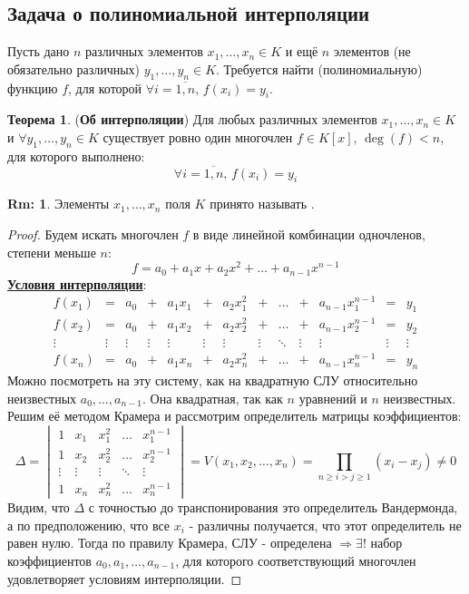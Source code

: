 \documentclass[12pt]{article}
\theoremstyle{definition}
\newtheorem{rem}{Rm:}
\newtheorem{theorem}{Теорема}
\begin{document}
\subsection*{Задача о полиномиальной интерполяции}
Пусть дано $n$ различных элементов $x_1, \dotsc, x_n \in K$ и ещё $n$ элементов (не обязательно различных) $y_1, \dotsc, y_n \in K$. Требуется найти (полиномиальную) функцию $f$, для которой $\forall i= \overline{1,n}, \, f(x_i) = y_i$.
\begin{theorem}(\textbf{Об интерполяции})
	Для любых различных элементов $x_1, \dotsc, x_n \in K$ и $\forall y_1, \dotsc, y_n \in K$ существует ровно один многочлен $f \in K[x], \, \deg(f) < n$, для которого выполнено: 
	$$
		\forall i= \overline{1,n}, \, f(x_i) = y_i
	$$
\end{theorem}
\begin{rem}
	Элементы $x_1,\dotsc,x_n$ поля $K$ принято называть .
\end{rem}
\begin{proof}
	Будем искать многочлен $f$ в виде линейной комбинации одночленов, степени меньше $n$:
	$$
		f = a_0 + a_1x + a_2 x^2 + \dotsc + a_{n-1}x^{n-1}
	$$
	\textbf{\uline{Условия интерполяции}}: 
	$$
		\begin{matrix}
			f(x_1) &=& a_0 &+& a_1x_1 &+& a_2 x_1^2 &+& \dotsc &+& a_{n-1}x_1^{n-1} &=& y_1\\
			f(x_2) &=& a_0 &+& a_1x_2 &+& a_2 x_2^2 &+& \dotsc &+& a_{n-1}x_2^{n-1} &=& y_2\\
			\vdots &\vdots& \vdots &\vdots&  \vdots &\vdots&  \vdots &\vdots&  \ddots &\vdots& \vdots &\vdots& \vdots\\
			f(x_n) &=& a_0 &+&  a_1x_n &+&  a_2 x_n^2 &+&  \dotsc &+&  a_{n-1}x_n^{n-1} &=& y_n
		\end{matrix}
	$$
	Можно посмотреть на эту систему, как на квадратную СЛУ относительно неизвестных $a_0, \dotsc, a_{n-1}$. Она квадратная, так как $n$ уравнений и $n$ неизвестных. Решим её методом Крамера и рассмотрим определитель матрицы коэффициентов:
	$$
		\Delta = 
		\begin{vmatrix}
			1 & x_1 & x_1^2 & \dotsc & x_1^{n-1}\\
			1 & x_2 & x_2^2 & \dotsc & x_2^{n-1}\\
			\vdots & \vdots & \vdots & \ddots & \vdots \\
			1 & x_n & x_n^2 & \dotsc & x_n^{n-1}
		\end{vmatrix} = V(x_1,x_2,\dotsc, x_n) = \prod\limits_{n \geq i > j \geq 1}(x_i - x_j) \neq 0
	$$
	Видим, что $\Delta$ с точностью до транспонирования это определитель Вандермонда, а по предположению, что все $x_i$ - различны получается, что этот определитель не равен нулю. Тогда по правилу Крамера, СЛУ - определена $\Rightarrow \exists!$ набор коэффициентов $a_0, a_1,\dotsc,a_{n-1}$, для которого соответствующий многочлен удовлетворяет условиям интерполяции.
\end{proof}
\end{document}
